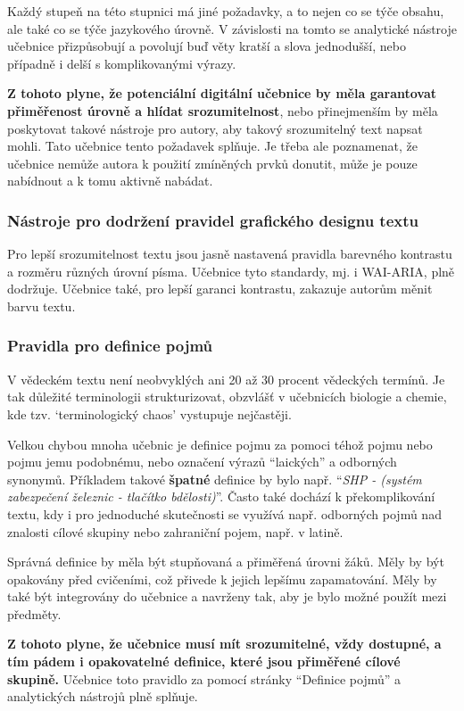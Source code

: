 \documentclass[12pt]{article}
\begin{document}
Každý stupeň na této stupnici má jiné požadavky, a to nejen co se týče obsahu, ale také co se týče jazykového úrovně. V závislosti na tomto se analytické nástroje učebnice přizpůsobují a povolují buď věty kratší a slova jednodušší, nebo případně i delší s komplikovanými výrazy.

\textbf{Z tohoto plyne, že potenciální  digitální učebnice by měla garantovat přiměřenost úrovně a hlídat srozumitelnost}, nebo přinejmenším by měla poskytovat takové nástroje pro autory, aby takový srozumitelný text napsat mohli. \cite[s. 40-50]{PAN2023}  Tato učebnice tento požadavek splňuje. Je třeba ale poznamenat, že učebnice nemůže autora k použití zmíněných prvků donutit, může je pouze nabídnout a k tomu aktivně nabádat.

\subsubsection{Nástroje pro dodržení pravidel grafického designu textu}
Pro lepší srozumitelnost textu jsou jasně nastavená pravidla barevného kontrastu a rozměru různých úrovní písma. Učebnice tyto standardy, mj. i WAI-ARIA, plně dodržuje. Učebnice také, pro lepší garanci kontrastu, zakazuje autorům měnit barvu textu.

\subsubsection{Pravidla pro definice pojmů}
V vědeckém textu není neobvyklých ani 20 až 30 procent vědeckých termínů. Je tak důležité terminologii strukturizovat, obzvlášť v učebnicích biologie a chemie, kde tzv. \enquote*{terminologický chaos} vystupuje nejčastěji.

Velkou chybou mnoha učebnic je definice pojmu za pomoci téhož pojmu nebo pojmu jemu podobnému, nebo označení výrazů \enquote{laických} a odborných synonymů. Příkladem takové \textbf{špatné} definice by bylo např. \enquote{\textit{SHP - (systém zabezpečení železnic - tlačítko bdělosti)}}. Často také dochází k překomplikování textu, kdy i pro jednoduché skutečnosti se využívá např. odborných pojmů nad znalosti cílové skupiny nebo zahraniční pojem, např. v latině.

Správná definice by měla být stupňovaná a přiměřená úrovni žáků. Měly by být opakovány před cvičeními, což přivede k jejich lepšímu zapamatování. Měly by také být integrovány do učebnice a navrženy tak, aby je bylo možné použít mezi předměty. \cite[s. 51-60]{PAN2023}

\textbf{Z tohoto plyne, že učebnice musí mít srozumitelné, vždy dostupné, a tím pádem i opakovatelné definice, které jsou přiměřené cílové skupině.} Učebnice toto pravidlo za pomocí stránky \enquote{Definice pojmů} a analytických nástrojů plně splňuje.
\end{document}
